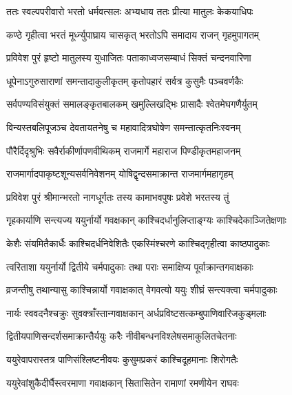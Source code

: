 

\twolineshloka
{ततः स्वल्पपरीवारो भरतो धर्मवत्सलः}
{अभ्यधाय ततः प्रीत्या मातुलः केकयाधिपः}%

\twolineshloka
{कण्ठे गृहीत्वा भरतं मूर्ध्न्युपाघ्राय चासकृत्}
{भरतोऽपि समादाय राजन् गृहमुपागतम्}%

\twolineshloka
{प्रविवेश पुरं हृष्टो मातुलस्य युधाजितः}
{पताकाध्वजसम्बाधं सिक्तं चन्दनवारिणा}%

\twolineshloka
{धूपेनाऽगुरुसाराणां समन्तादाकुलीकृतम्}
{कृतोपहारं सर्वत्र कुसुमैः पञ्चवर्णकैः}%

\twolineshloka
{सर्वपण्यविसंयुक्तं समालङ्कृतबालकम्}
{खमुल्लिखद्भिः प्रासादैः श्वेतमेघगणैर्युतम्}%

\twolineshloka
{विन्यस्तबलिपूजञ्च देवतायतनेषु च}
{महावादित्रघोषेण समन्तात्कृतनिःस्वनम्}%

\twolineshloka
{पौरैर्दिदृश्रुभिः सवैर्राकीर्णापणवीथिकम्}
{राजमार्गे महाराज पिण्डीकृतमहाजनम्}%

\twolineshloka
{राजमार्गादपाकृष्टशून्यसर्वनिवेशनम्}
{योषिद्वृन्दसमाक्रान्त राजमार्गमहागृहम्}%

\twolineshloka
{प्रविवेश पुरं श्रीमान्भरतो नागधूर्गतः}
{तस्य कामाभवपुषः प्रवेशे भरतस्य तुं}%

\twolineshloka
{गृहकार्याणि सन्त्यज्य ययुर्नार्यो गवक्षकान्}
{काश्चिदर्धानुलिप्ताङ्ग्यः काश्चिदेकाञ्जितेक्षणाः} %

\twolineshloka
{केशैः संयमितैकार्धैः काश्चिदर्धनिवेशितैः}
{एकस्मिंश्चरणे काश्चिद्गृहीत्वा काष्ठपादुकाः}%

\twolineshloka
{त्वरिताशा ययुर्नार्यो द्वितीये चर्मपादुकाः}
{तथा पराः समाक्षिप्य पूर्वाक्रान्तगवाक्षकाः}%

\twolineshloka
{व्रजन्तीषु तथान्यासु काश्चिन्नार्यो गवाक्षकात्}
{वेगवत्यो ययुः शीघ्रं सन्त्यक्त्वा चर्मपादुकाः}%

\twolineshloka
{नार्यः स्ववदनैश्चक्रुः सुवक्त्राँस्तान्गवाक्षकान्}
{अर्धप्रविष्टसत्कम्बुपाणिवारिजकुड्मलाः}%

\twolineshloka
{द्वितीयपाणिसन्दर्शसमाक्रान्तैर्ययुः करैः}
{नीवीबन्धनविश्लेषसमाकुलितचेतनाः}%

\twolineshloka
{ययुरेवापरास्तत्र पाणिसंश्लिष्टनीवयः}
{कुसुमप्रकरं काश्चिदूहमानाः शिरोगतैः}%

\twolineshloka
{ययुरेवांशुकैदीर्घैस्त्वरमाणा गवाक्षकान्}
{सितासितेन रामाणां रमणीयेन राघवः}%

